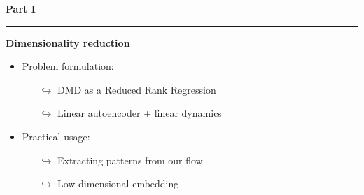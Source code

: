 
\begin{frame}[t, c]{}{}
  \begin{minipage}{.48\textwidth}
    \centering
    {
      \Large\textbf{Part I}
    }
    
    \bigskip
    
    \rule{\textwidth}{0.001\textwidth}
    
    \bigskip
    
    {
      \large
      \textbf{Dimensionality reduction}
    }
    
    \medskip
    
    \begin{itemize}
    \item Problem formulation:
      \begin{itemize}
      \item[\(	\hookrightarrow \)] DMD as a Reduced Rank Regression
      \item[\( \hookrightarrow	\)] Linear autoencoder + linear dynamics
      \end{itemize}
      
      \medskip
      
    \item Practical usage:
      \begin{itemize}
      \item[\(	\hookrightarrow	\)] Extracting patterns from our flow
      \item[\(	\hookrightarrow \)] Low-dimensional embedding
      \end{itemize}
      
    \end{itemize}
    
  \end{minipage}%
  \hfill
  \begin{minipage}{.48\textwidth}
    \centering
  \end{minipage}
\end{frame}

